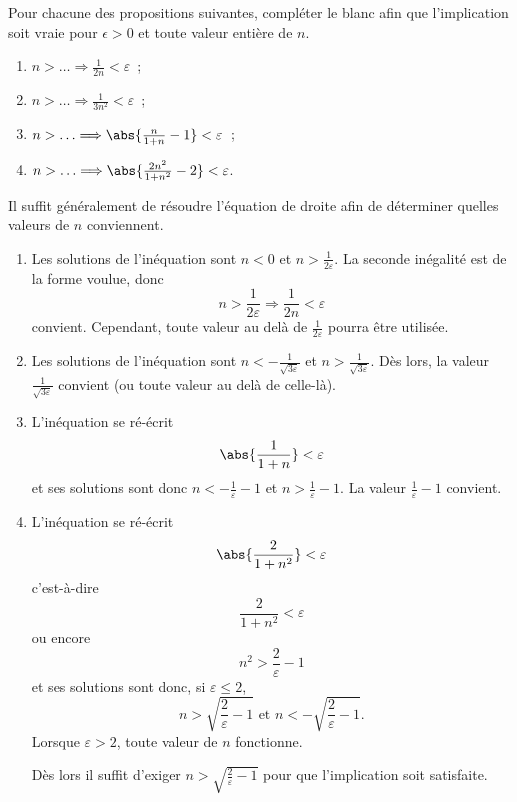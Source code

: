 \documentclass[12pt,french,oneside,a4paper]{memoir} %
\begin{document}
\begin{exo}
Pour chacune des propositions suivantes, compléter le blanc afin que l'implication soit vraie pour $\epsilon > 0$ et toute valeur entière de $n$.
\begin{enumerate}
\item $n > \ldots \Longrightarrow \frac{1}{2n} < \varepsilon$~;
\item $n > \ldots \Longrightarrow \frac{1}{3n^2} < \varepsilon$~;
\item $n > \ldots \Longrightarrow \abs{\frac{n}{1+n}-1} < \varepsilon$~;
\item $n > \ldots \Longrightarrow \abs{\frac{2n^2}{1+n^2}-2} < \varepsilon$.
\end{enumerate}

\begin{correction}
  Il suffit généralement de résoudre l'équation de droite afin de déterminer quelles valeurs de $n$ conviennent. 
  \begin{enumerate}
  \item Les solutions de l'inéquation sont $n < 0$ et $n > \frac{1}{2\varepsilon}$. La seconde inégalité est de la forme voulue, donc
    \begin{equation*}
      n > \frac{1}{2\varepsilon} \Longrightarrow \frac{1}{2n} < \varepsilon
    \end{equation*}
    convient. Cependant, toute valeur au delà de $\frac{1}{2\varepsilon}$ pourra être utilisée.
  \item Les solutions de l'inéquation sont $n < -\frac{1}{\sqrt{3\varepsilon}}$ et $n > \frac{1}{\sqrt{3\varepsilon}}$. Dès lors, la valeur $\frac{1}{\sqrt{3\varepsilon}}$ convient (ou toute valeur au delà de celle-là).
  \item L'inéquation se ré-écrit
    \begin{equation*}
      \abs{\frac{1}{1+n}} < \varepsilon
    \end{equation*}
    et ses solutions sont donc $n < - \frac{1}{\varepsilon} - 1$ et $n > \frac{1}{\varepsilon} - 1$. La valeur $\frac{1}{\varepsilon} - 1$ convient.
  \item L'inéquation se ré-écrit
    \begin{equation*}
      \abs{\frac{2}{1+n^{2}}} < \varepsilon
    \end{equation*}
    c'est-à-dire
    \begin{equation*}
      \frac{2}{1+n^{2}} < \varepsilon
    \end{equation*}
    ou encore
    \begin{equation*}
      n^{2} > \frac{2}{\varepsilon} - 1
    \end{equation*}
    et ses solutions sont donc, si $\varepsilon \leq 2$,
    \begin{equation*}
      n > \sqrt{\frac{2}{\varepsilon} - 1} \text{ et } n < - \sqrt{\frac{2}{\varepsilon} - 1}.
    \end{equation*}
    Lorsque $\varepsilon > 2$, toute valeur de $n$ fonctionne.

    Dès lors il suffit d'exiger $n > \sqrt{\frac{2}{\varepsilon} - 1}$ pour que l'implication soit satisfaite.
  \end{enumerate}
\end{correction}
\end{exo}
\end{document}
